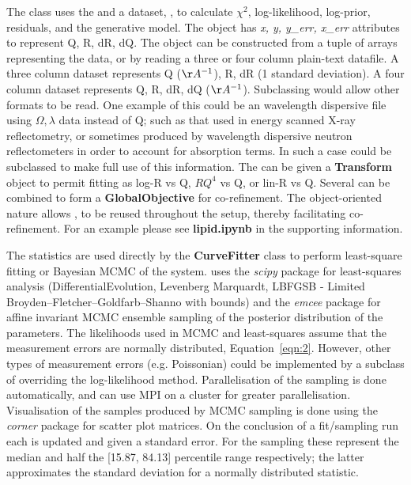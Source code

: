 \documentclass[12pt]{article}
\begin{document}
The \Objective class uses the \ReflectModel and a dataset, \DataD, to calculate $\chi^2$, log-likelihood, log-prior, residuals, and the generative model.
The \DataD object has \emph{x, y, y\_err, x\_err} attributes to represent Q, R, dR, dQ. The \DataD object can be constructed from a tuple of arrays representing the data, or by reading a three or four column plain-text datafile. A three column dataset represents Q ($\AA^{-1}$), R, dR (1 standard deviation). A four column dataset represents Q, R, dR, dQ ($\AA^{-1}$). Subclassing \DataD would allow other formats to be read. One example of this could be an wavelength dispersive file using $\Omega, \lambda$ data instead of Q; such as that used in energy scanned X-ray reflectometry, or sometimes produced by wavelength dispersive neutron reflectometers in order to account for absorption terms. In such a case \ReflectModel could be subclassed to make full use of this information.
The \Objective can be given a \textbf{Transform} object to permit fitting as log-R vs Q, $RQ^4$ vs Q, or lin-R vs Q. Several \Objective can be combined to form a \textbf{GlobalObjective} for co-refinement. The object-oriented nature allows \Parameter, \Component to be reused throughout the setup, thereby facilitating co-refinement.
For an example please see \textbf{lipid.ipynb} in the supporting information.

The \Objective statistics are used directly by the \textbf{CurveFitter} class to perform least-square fitting or Bayesian MCMC of the system.  uses the \emph{scipy} package for least-squares analysis (DifferentialEvolution, Levenberg Marquardt, LBFGSB - Limited Broyden–Fletcher–Goldfarb–Shanno with bounds) and the  \emph{emcee} package \cite{emcee} for affine invariant MCMC ensemble sampling of the posterior distribution of the parameters. The likelihoods used in MCMC and least-squares assume that the measurement errors are normally distributed, Equation~\ref{eqn:2}. However, other types of measurement errors (e.g. Poissonian) could be implemented by a subclass of \Objective  overriding the log-likelihood method.
Parallelisation of the sampling is done automatically, and can use MPI on a cluster for greater parallelisation. Visualisation of the samples produced by MCMC sampling is done using the \emph{corner} package \cite{corner} for scatter plot matrices. On the conclusion of a fit/sampling run each \Parameter is updated and given a standard error. For the sampling these represent the median and half the [15.87, 84.13] percentile range respectively; the latter approximates the standard deviation for a normally distributed statistic.
\end{document}
